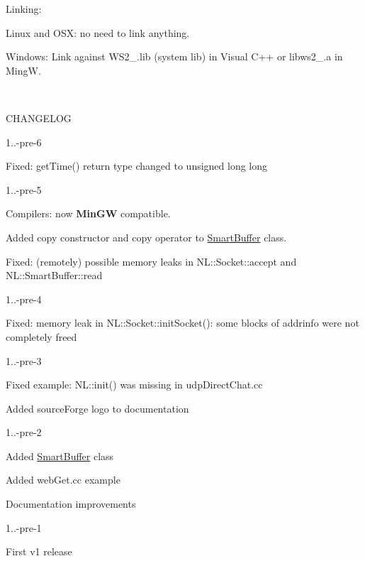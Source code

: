 \begin{DoxyParagraph}{Linking\+:}

\end{DoxyParagraph}
\begin{DoxyItemize}
\item Linux and O\+S\+X\+: no need to link anything. \item Windows\+: Link against W\+S2\+\_.\+lib (system lib) in Visual C++ or libws2\+\_.\+a in Ming\+W.\end{DoxyItemize}
~\newline
\begin{DoxyParagraph}{C\+H\+A\+N\+G\+E\+L\+O\+G}



\end{DoxyParagraph}
1..-\/pre-\/6 \begin{DoxyItemize}
\item Fixed\+: get\+Time() return type changed to unsigned long long\end{DoxyItemize}
1..-\/pre-\/5 \begin{DoxyItemize}
\item Compilers\+: now {\bfseries Min\+G\+W} compatible. \item Added copy constructor and copy operator to \hyperlink{classSmartBuffer}{Smart\+Buffer} class. \item Fixed\+: (remotely) possible memory leaks in N\+L\+::\+Socket\+::accept and N\+L\+::\+Smart\+Buffer\+::read\end{DoxyItemize}
1..-\/pre-\/4 \begin{DoxyItemize}
\item Fixed\+: memory leak in N\+L\+::\+Socket\+::init\+Socket()\+: some blocks of addrinfo were not completely freed\end{DoxyItemize}
1..-\/pre-\/3 \begin{DoxyItemize}
\item Fixed example\+: N\+L\+::init() was missing in udp\+Direct\+Chat.\+cc \item Added source\+Forge logo to documentation\end{DoxyItemize}
1..-\/pre-\/2 \begin{DoxyItemize}
\item Added \hyperlink{classSmartBuffer}{Smart\+Buffer} class \item Added web\+Get.\+cc example \item Documentation improvements\end{DoxyItemize}
1..-\/pre-\/1 \begin{DoxyItemize}
\item First v1 release \end{DoxyItemize}
